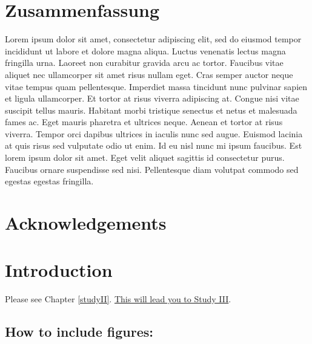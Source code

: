\documentclass[
]{scrbook}
\begin{document}
\chapter*{Zusammenfassung}\label{zusammenfassung}

Lorem ipsum dolor sit amet, consectetur adipiscing elit, sed do eiusmod tempor incididunt ut labore et dolore magna aliqua. Luctus venenatis lectus magna fringilla urna. Laoreet non curabitur gravida arcu ac tortor. Faucibus vitae aliquet nec ullamcorper sit amet risus nullam eget. Cras semper auctor neque vitae tempus quam pellentesque. Imperdiet massa tincidunt nunc pulvinar sapien et ligula ullamcorper. Et tortor at risus viverra adipiscing at. Congue nisi vitae suscipit tellus mauris. Habitant morbi tristique senectus et netus et malesuada fames ac. Eget mauris pharetra et ultrices neque. Aenean et tortor at risus viverra. Tempor orci dapibus ultrices in iaculis nunc sed augue. Euismod lacinia at quis risus sed vulputate odio ut enim. Id eu nisl nunc mi ipsum faucibus. Est lorem ipsum dolor sit amet. Eget velit aliquet sagittis id consectetur purus. Faucibus ornare suspendisse sed nisi. Pellentesque diam volutpat commodo sed egestas egestas fringilla.

\chapter*{Acknowledgements}\label{acknowledgements}

\chapter{Introduction}\label{introduction}

Please see Chapter \ref{studyII}.
\hyperref[studyIII]{This will lead you to Study III}.

\section{How to include figures:}\label{how-to-include-figures}
\end{document}
